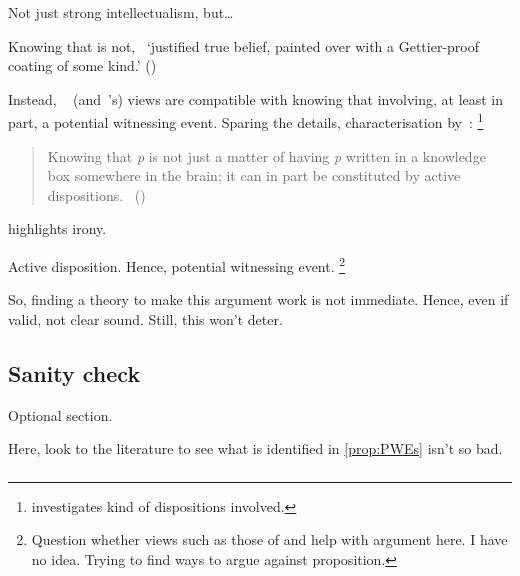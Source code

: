 \begin{note}
  Not just strong intellectualism, but\dots

  Knowing that is not,~\cite{Stalnaker:2012tp} `justiﬁed true belief, painted over with a Gettier-proof coating of some kind.' (\citeyear[754]{Stalnaker:2012tp})

  Instead, ~\citeauthor{Stanley:2011ut} (and~\citeauthor{Stalnaker:2012tp}'s) views are compatible with knowing that involving, at least in part, a potential witnessing event.
  Sparing the details, characterisation by~\citeauthor{Weatherson:2017tb}:%
  \footnote{
    \textcite{Weatherson:2017tb} investigates kind of dispositions involved.
  }

  \nocite{Stanley:2012wg}
  \begin{quote}
    Knowing that \emph{p} is not just a matter of having \emph{p} written in a knowledge box somewhere in the brain; it can in part be constituted by active dispositions.%
    \mbox{ }\hfill\mbox{(\citeyear[8]{Weatherson:2017tb})}
  \end{quote}

  \citeauthor{Stalnaker:2012tp} highlights irony.

  Active disposition.
  Hence, potential witnessing event.%
  \footnote{
    Question whether views such as those of \cite{Stalnaker:2012tp} and \citeauthor{Stanley:2011ut} help with argument here.
    I have no idea.
    Trying to find ways to argue against proposition.
  }
\end{note}

\begin{note}
  So, finding a theory to make this argument work is not immediate.
  Hence, even if valid, not clear sound.
  Still, this won't deter.
\end{note}

\subsection{Sanity check}
\label{sec:sanity-check}

\begin{note}
  Optional section.

  Here, look to the literature to see what is identified in \autoref{prop:PWEs} isn't so bad.
\end{note}

\subsubsection{}
\label{sec:carroll}

